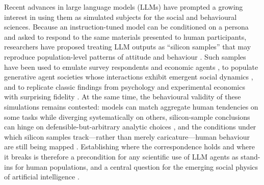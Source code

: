 \documentclass[openacc]{rsproca_new}
\begin{document}
Recent advances in large language models (LLMs) have prompted a growing interest in using them as simulated subjects for the social and behavioural sciences. Because an instruction-tuned model can be conditioned on a persona and asked to respond to the same materials presented to human participants, researchers have proposed treating LLM outputs as ``silicon samples'' that may reproduce population-level patterns of attitude and behaviour \cite{argyle2023out}. Such samples have been used to emulate survey respondents and economic agents \cite{horton2023llm}, to populate generative agent societies whose interactions exhibit emergent social dynamics \cite{park2023generative}, and to replicate classic findings from psychology and experimental economics with surprising fidelity \cite{aher2023using}. At the same time, the behavioural validity of these simulations remains contested: models can match aggregate human tendencies on some tasks while diverging systematically on others, silicon-sample conclusions can hinge on defensible-but-arbitrary analytic choices \cite{cummins2025threat}, and the conditions under which silicon samples track---rather than merely caricature---human behaviour are still being mapped \cite{mei2024turing,hullman2026validating}. Establishing where the correspondence holds and where it breaks is therefore a precondition for any scientific use of LLM agents as stand-ins for human populations, and a central question for the emerging social physics of artificial intelligence \cite{han2026socialphysics}.
\end{document}
